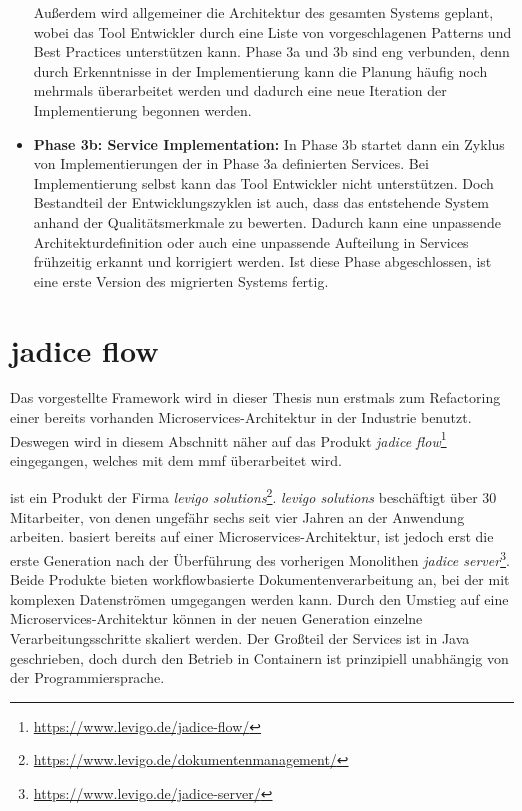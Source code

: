 \begin{itemize}
	Außerdem wird allgemeiner die Architektur des gesamten Systems geplant, wobei das Tool Entwickler durch eine Liste von vorgeschlagenen Patterns und Best Practices unterstützen kann.
	 Phase 3a und 3b sind eng verbunden, denn durch Erkenntnisse in der Implementierung kann die Planung häufig noch mehrmals überarbeitet werden und dadurch eine neue Iteration der Implementierung begonnen werden.
	\item \textbf{Phase 3b: Service Implementation:} In Phase 3b startet dann ein Zyklus von Im\-ple\-men\-tie\-rung\-en der in Phase 3a definierten Services.
	Bei Implementierung selbst kann das Tool Entwickler nicht unterstützen.
	Doch Bestandteil der Entwicklungszyklen ist auch, dass das entstehende System anhand der Qualitätsmerkmale zu bewerten.
	Dadurch kann eine unpassende Architekturdefinition oder auch eine unpassende Aufteilung in Services frühzeitig erkannt und korrigiert werden.
	Ist diese Phase abgeschlossen, ist eine erste Version des migrierten Systems fertig.
\end{itemize}

\section{jadice flow}

Das vorgestellte Framework wird in dieser Thesis nun erstmals zum Refactoring einer bereits vorhanden Microservices-Architektur in der Industrie benutzt.
Deswegen wird in diesem Abschnitt näher auf das Produkt \emph{jadice flow}\footnote{\url{https://www.levigo.de/jadice-flow/}} eingegangen, welches mit dem \gls{mmf} überarbeitet wird.

\jf ist ein Produkt der Firma \emph{levigo solutions}\footnote{\url{https://www.levigo.de/dokumentenmanagement/}}.
\emph{levigo solutions} beschäftigt über 30 Mitarbeiter, von denen ungefähr sechs seit vier Jahren an der Anwendung arbeiten.
\jf basiert bereits auf einer Microservices-Architektur, ist jedoch erst die erste Generation nach der Überführung des vorherigen Monolithen \emph{jadice server}\footnote{\url{https://www.levigo.de/jadice-server/}}.
Beide Produkte bieten workflowbasierte Dokumentenverarbeitung an, bei der mit komplexen Datenströmen umgegangen werden kann.
Durch den Umstieg auf eine Microservices-Architektur können in der neuen Generation einzelne Verarbeitungsschritte skaliert werden.
Der Großteil der Services ist in Java geschrieben, doch durch den Betrieb in Containern ist \jf prinzipiell unabhängig von der Programmiersprache.

